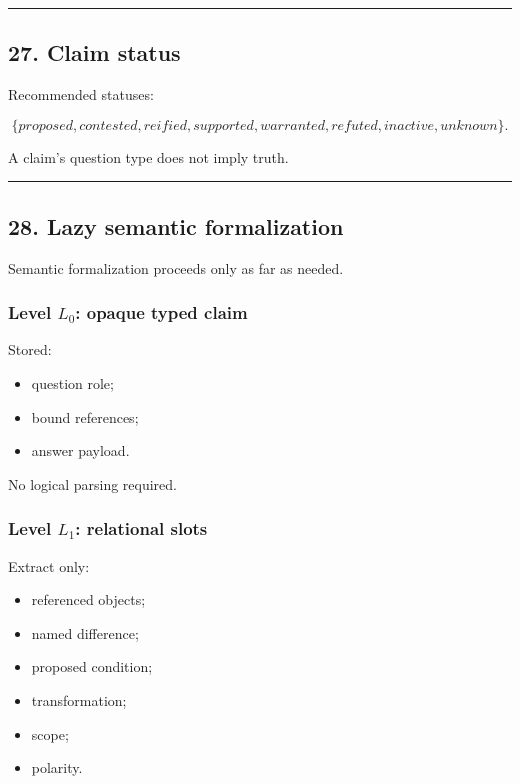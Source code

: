 \documentclass[
]{article}
\providecommand{\tightlist}{%
  \setlength{\itemsep}{0pt}\setlength{\parskip}{0pt}}
\begin{document}
\begin{center}\rule{0.5\linewidth}{0.5pt}\end{center}

\subsection{27. Claim status}\label{claim-status}

Recommended statuses:

\[
\boxed{
\{
proposed,
contested,
reified,
supported,
warranted,
refuted,
inactive,
unknown
\}.
}
\]

A claim's question type does not imply truth.

\begin{center}\rule{0.5\linewidth}{0.5pt}\end{center}

\subsection{28. Lazy semantic
formalization}\label{lazy-semantic-formalization}

Semantic formalization proceeds only as far as needed.

\subsubsection{\texorpdfstring{Level \(L_0\): opaque typed
claim}{Level L\_0: opaque typed claim}}\label{level-l_0-opaque-typed-claim}

Stored:

\begin{itemize}
\tightlist
\item
  question role;
\item
  bound references;
\item
  answer payload.
\end{itemize}

No logical parsing required.

\subsubsection{\texorpdfstring{Level \(L_1\): relational
slots}{Level L\_1: relational slots}}\label{level-l_1-relational-slots}

Extract only:

\begin{itemize}
\tightlist
\item
  referenced objects;
\item
  named difference;
\item
  proposed condition;
\item
  transformation;
\item
  scope;
\item
  polarity.
\end{itemize}
\end{document}
